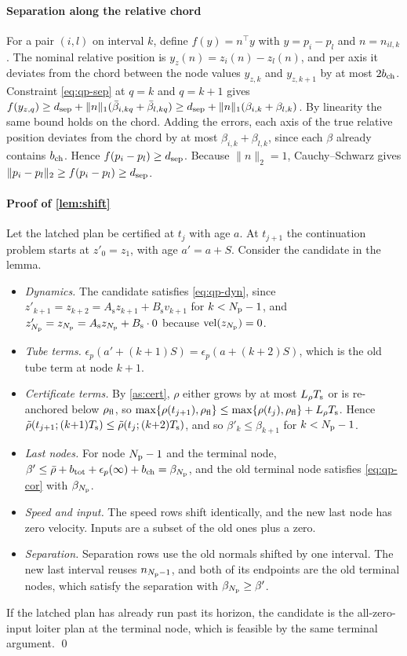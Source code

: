 \paragraph{Separation along the relative chord} For a pair $(i,l)$ on interval
$k$, define $f(y)=n^\top y$ with $y=p_i-p_l$ and $n=n_{il,k}$. The nominal
relative position is $y_z(n)=z_i(n)-z_l(n)$, and per axis it deviates from the
chord between the node values $y_{z,k}$ and $y_{z,k+1}$ by at most $2b_{\mathrm{ch}}$.
Constraint \eqref{eq:qp-sep} at $q=k$ and $q=k{+}1$ gives
$f(y_{z,q})\ge d_{\mathrm{sep}}+\|n\|_1(\bar\beta_{i,kq}+\bar\beta_{l,kq})\ge d_{\mathrm{sep}}+\|n\|_1(\beta_{i,k}+\beta_{l,k})$.
By linearity the same bound holds on the chord. Adding the errors, each axis
of the true relative position deviates from the chord by at most
$\beta_{i,k}+\beta_{l,k}$, since each $\beta$ already contains $b_{\mathrm{ch}}$. Hence
$f(p_i-p_l)\ge d_{\mathrm{sep}}$. Because $\|n\|_2=1$, Cauchy--Schwarz gives
$\|p_i-p_l\|_2\ge f(p_i-p_l)\ge d_{\mathrm{sep}}$.

\paragraph{Proof of \cref{lem:shift}} Let the latched plan be certified at
$t_j$ with age $a$. At $t_{j+1}$ the continuation problem starts at
$z'_0=z_1$, with age $a'=a+S$. Consider the candidate in the lemma.
\begin{itemize}
\item \emph{Dynamics.} The candidate satisfies \eqref{eq:qp-dyn}, since
  $z'_{k+1}=z_{k+2}=A_{\mathrm s}z_{k+1}+B_{\mathrm s}v_{k+1}$ for
  $k<N_{\mathrm{p}}-1$, and $z'_{N_{\mathrm{p}}}=z_{N_{\mathrm{p}}}=A_{\mathrm s}z_{N_{\mathrm{p}}}+B_{\mathrm s}\cdot0$
  because $\mathrm{vel}(z_{N_{\mathrm{p}}})=0$.
\item \emph{Tube terms.} $\epsilon_p(a'+(k{+}1)S)=\epsilon_p(a+(k{+}2)S)$,
  which is the old tube term at node $k{+}1$.
\item \emph{Certificate terms.} By \cref{as:cert}, $\rho$ either grows by at
  most $L_{\rho}T_{\mathrm{s}}$ or is re-anchored below $\rho_{\mathrm{fl}}$, so
  $\max\{\rho(t_{j+1}),\rho_{\mathrm{fl}}\}\le\max\{\rho(t_j),\rho_{\mathrm{fl}}\}+L_{\rho}T_{\mathrm{s}}$. Hence
  $\tilde\rho(t_{j+1};(k{+}1)T_{\mathrm{s}})\le\tilde\rho(t_j;(k{+}2)T_{\mathrm{s}})$, and so
  $\beta'_k\le\beta_{k+1}$ for $k<N_{\mathrm{p}}-1$.
\item \emph{Last nodes.} For node $N_{\mathrm{p}}-1$ and the terminal node, $\beta'\le\bar\rho+b_{\mathrm{tot}}+\epsilon_p(\infty)+b_{\mathrm{ch}}=\beta_{N_{\mathrm{p}}}$, and the old terminal node satisfies \eqref{eq:qp-cor} with $\beta_{N_{\mathrm{p}}}$.
\item \emph{Speed and input.} The speed rows shift identically, and the new
  last node has zero velocity. Inputs are a subset of the old ones plus a
  zero.
\item \emph{Separation.} Separation rows use the old normals shifted by one
  interval. The new last interval reuses $n_{N_{\mathrm{p}}-1}$, and both of its
  endpoints are the old terminal nodes, which satisfy the separation with
  $\beta_{N_{\mathrm{p}}}\ge\beta'$.
\end{itemize}
If the latched plan has already run past its horizon, the candidate is the
all-zero-input loiter plan at the terminal node, which is feasible by the
same terminal argument. \qed

